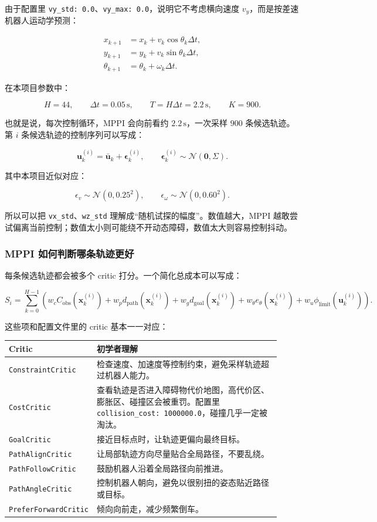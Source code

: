 \documentclass[UTF8,11pt,a4paper]{ctexart}
\newcommand{\bs}[1]{\bm{#1}}
\begin{document}
由于配置里 \texttt{vy\_std: 0.0}、\texttt{vy\_max: 0.0}，说明它不考虑横向速度 \(v_y\)，而是按差速机器人运动学预测：

\[
\boxed{
\begin{aligned}
x_{k+1} &= x_k + v_k\cos\theta_k\Delta t,\\
y_{k+1} &= y_k + v_k\sin\theta_k\Delta t,\\
\theta_{k+1} &= \theta_k + \omega_k\Delta t.
\end{aligned}
}
\]

在本项目参数中：

\[
\boxed{
H=44,\qquad
\Delta t=0.05\,\mathrm{s},\qquad
T=H\Delta t=2.2\,\mathrm{s},\qquad
K=900.
}
\]

也就是说，每次控制循环，MPPI 会向前看约 \(2.2\,\mathrm{s}\)，一次采样 \(900\) 条候选轨迹。第 \(i\) 条候选轨迹的控制序列可以写成：

\[
\bs u_k^{(i)}
=
\bar{\bs u}_k + \bs\epsilon_k^{(i)},
\qquad
\bs\epsilon_k^{(i)}
\sim
\mathcal N(\bs 0,\Sigma).
\]

其中本项目近似对应：

\[
\epsilon_v\sim\mathcal N(0,0.25^2),
\qquad
\epsilon_\omega\sim\mathcal N(0,0.60^2).
\]

所以可以把 \texttt{vx\_std}、\texttt{wz\_std} 理解成“随机试探的幅度”。数值越大，MPPI 越敢尝试偏离当前控制；数值太小则可能绕不开动态障碍，数值太大则容易控制抖动。

\subsubsection{MPPI 如何判断哪条轨迹更好}

每条候选轨迹都会被多个 critic 打分。一个简化总成本可以写成：

\[
\boxed{
S_i
=
\sum_{k=0}^{H-1}
\left(
w_c C_{\mathrm{obs}}(\bs x_k^{(i)})
+w_p d_{\mathrm{path}}(\bs x_k^{(i)})
+w_g d_{\mathrm{goal}}(\bs x_k^{(i)})
+w_\theta e_\theta(\bs x_k^{(i)})
+w_u \phi_{\mathrm{limit}}(\bs u_k^{(i)})
\right).
}
\]

这些项和配置文件里的 critic 基本一一对应：

\begin{longtable}{p{0.24\linewidth}p{0.68\linewidth}}
\toprule
Critic & 初学者理解 \\
\midrule
\texttt{ConstraintCritic} & 检查速度、加速度等控制约束，避免采样轨迹超过机器人能力。\\
\texttt{CostCritic} & 查看轨迹是否进入障碍物代价地图，高代价区、膨胀区、碰撞区会被重罚。配置里 \texttt{collision\_cost: 1000000.0}，碰撞几乎一定被淘汰。\\
\texttt{GoalCritic} & 接近目标点时，让轨迹更偏向最终目标。\\
\texttt{PathAlignCritic} & 让局部轨迹方向尽量贴合全局路径，不要乱绕。\\
\texttt{PathFollowCritic} & 鼓励机器人沿着全局路径向前推进。\\
\texttt{PathAngleCritic} & 控制机器人朝向，避免以很别扭的姿态贴近路径或目标。\\
\texttt{PreferForwardCritic} & 倾向向前走，减少频繁倒车。\\
\bottomrule
\end{longtable}
\end{document}
